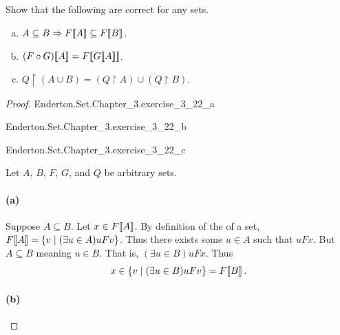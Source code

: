 \documentclass{report}
\begin{document}
\subsection{}%

Show that the following are correct for any sets.

\begin{enumerate}[(a)]
  \item $A \subseteq B \Rightarrow F\!\left\llbracket A\right\rrbracket \subseteq F\!\left\llbracket B\right\rrbracket$.
  \item $(F \circ G)\!\left\llbracket A\right\rrbracket = F\!\left\llbracket G\!\left\llbracket A\right\rrbracket\right\rrbracket$.
  \item $Q \restriction (A \cup B) =
    (Q \restriction A) \cup (Q \restriction B)$.
\end{enumerate}

\begin{proof}

  \statementpadding

    {Enderton.Set.Chapter\_3.exercise\_3\_22\_a}

    {Enderton.Set.Chapter\_3.exercise\_3\_22\_b}

    {Enderton.Set.Chapter\_3.exercise\_3\_22\_c}

  Let $A$, $B$, $F$, $G$, and $Q$ be arbitrary sets.

  \paragraph{(a)}%

    Suppose $A \subseteq B$.
    Let $x \in F\!\left\llbracket A\right\rrbracket$.
    By definition of the  of a set,
      $F\!\left\llbracket A\right\rrbracket = \{v \mid (\exists u \in A) uFv\}$.
    Thus there exists some $u \in A$ such that $uFx$.
    But $A \subseteq B$ meaning $u \in B$.
    That is, $(\exists u \in B)uFx$.
    Thus $$x \in \{v \mid (\exists u \in B)uFv\} = F\!\left\llbracket B\right\rrbracket.$$

  \paragraph{(b)}%


\end{proof}
\end{document}
